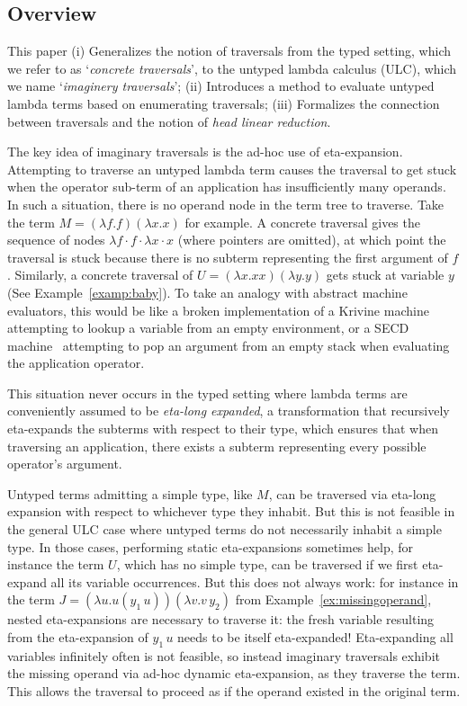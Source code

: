 \documentclass{elsarticle}
\theoremstyle{plain}
\theoremstyle{definition}
\theoremstyle{remark}
\begin{document}
\subsection{Overview}
This paper
(i) Generalizes the notion of traversals from the typed setting, which we refer to as `\emph{concrete traversals}', to the untyped lambda calculus (ULC), which we name `\emph{imaginery traversals}';
(ii) Introduces a method to evaluate untyped lambda terms based on enumerating traversals;
(iii) Formalizes the connection between traversals and the notion of \emph{head linear reduction}.

The key idea of imaginary traversals is the ad-hoc use of eta-expansion. Attempting to traverse an untyped lambda term causes the traversal to get stuck when the operator sub-term of an application has insufficiently many operands. In such a situation, there is no operand node in the term tree to traverse. Take the term $M = (\lambda f.f)(\lambda x.x)$ for example. A concrete traversal gives the sequence of nodes $\lambda f \cdot f \cdot \lambda x \cdot x$ (where pointers are omitted), at which point the traversal is stuck because there is no subterm representing the first argument of $f$.
Similarly, a concrete traversal of $U = (\lambda x. x x)(\lambda y. y)$ gets  stuck at variable $y$ (See Example~\ref{examp:baby}). To take an analogy with abstract machine evaluators, this would be like a broken implementation of a Krivine machine~\cite{Krivine2007} attempting to lookup a variable from an empty environment, or a SECD machine~\cite{landin-secd} attempting to pop an argument from an empty stack when evaluating the application operator.

This situation never occurs in the typed setting where lambda terms are
conveniently assumed to be \emph{eta-long expanded}, a transformation that recursively eta-expands the subterms with respect to their type,
which ensures that when traversing an application, there exists a subterm representing every possible operator's argument.

Untyped terms admitting a simple type, like $M$, can be traversed via eta-long expansion with respect to whichever type they inhabit.
But this is not feasible in the general ULC case where untyped terms do not necessarily inhabit a simple type. In those cases, performing static eta-expansions sometimes help, for instance the term $U$, which has no simple type, can be traversed if we first eta-expand all its variable occurrences. But this does not always work: for instance in the term
 $J = (\lambda u . u(y_1\, u)) (\lambda v . v\, y_2)$ from
 Example~\ref{ex:missingoperand}, nested eta-expansions are necessary to traverse it:
 the fresh variable resulting from the eta-expansion of $y_1\, u$ needs to be itself eta-expanded! Eta-expanding all variables infinitely often is not feasible, so instead imaginary traversals
  exhibit the missing operand via ad-hoc dynamic eta-expansion, as they traverse the term.
 This allows the traversal to proceed as if the operand existed in the original term.
\end{document}
